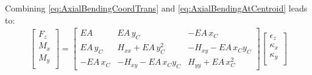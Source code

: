 \documentclass[11pt]{article}
\newcommand{\cent}{{C}}
\newcommand{\EA}{{E\!A}\,}
\begin{document}
% 
% 
Combining \autoref{eq:AxialBendingCoordTrans} and \autoref{eq:AxialBendingAtCentroid} leads to:
\begin{align}
    \begin{bmatrix}F_z \\ M_x \\ M_y\\ \end{bmatrix}
    =
    \begin{bmatrix}
    \EA & \EA y_{\cent} & - \EA x_{\cent}\\
    \EA y_{\cent} & H_{xx} + \EA y_{\cent}^{2} & - H_{xy} - \EA x_{\cent} y_{\cent}\\
  - \EA x_{\cent} & - H_{xy} - \EA x_{\cent} y_{\cent} & H_{yy} + \EA x_{\cent}^{2}\end{bmatrix}
    \begin{bmatrix}\epsilon_z \\ \kappa_x \\ \kappa_y\\ \end{bmatrix}
    \label{eq:AxialBendingOrigin}
\end{align}



\end{document}
